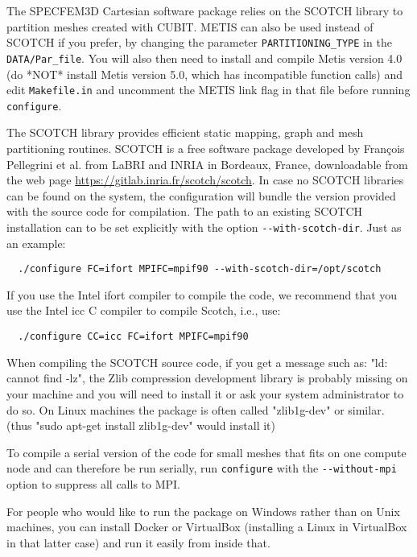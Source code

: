 The SPECFEM3D Cartesian software package relies on the SCOTCH library
to partition meshes created with CUBIT. METIS \citep{KaKu98a,KaKu98c,KaKu98b}
can also be used instead of SCOTCH if you prefer, by changing the parameter
\texttt{PARTITIONING\_TYPE} in the \texttt{DATA/Par\_file}. You will also then need to install
and compile Metis version 4.0 (do {*}NOT{*} install Metis version
5.0, which has incompatible function calls) and edit \texttt{Makefile.in}
and uncomment the METIS link flag in that file before running \texttt{configure}.\newline


The SCOTCH library \citep{PeRo96} provides efficient static mapping,
graph and mesh partitioning routines. SCOTCH is a free software package
developed by Fran\c{c}ois Pellegrini et al. from LaBRI and INRIA in Bordeaux,
France, downloadable from the web page \url{https://gitlab.inria.fr/scotch/scotch}.
In case no SCOTCH libraries can be found on the system, the configuration
will bundle the version provided with the source code for compilation.
The path to an existing SCOTCH installation can to be set explicitly
with the option \texttt{-{}-with-scotch-dir}. Just as an example:
\begin{verbatim}
  ./configure FC=ifort MPIFC=mpif90 --with-scotch-dir=/opt/scotch
\end{verbatim}
\noindent
If you use the Intel ifort compiler to compile the code, we recommend
that you use the Intel icc C compiler to compile Scotch, i.e., use:
\begin{verbatim}
  ./configure CC=icc FC=ifort MPIFC=mpif90
\end{verbatim}

When compiling the SCOTCH source code, if you get a message such as: "ld: cannot find -lz",
the Zlib compression development library is probably missing on your machine and you will need to install it or ask your system administrator to
do so. On Linux machines the package is often called "zlib1g-dev" or similar. (thus "sudo apt-get install zlib1g-dev" would install it)\newline

To compile a serial version of the code for small meshes that fits
on one compute node and can therefore be run serially, run \texttt{configure}
with the \texttt{-{}-without-mpi} option to suppress all calls to
MPI.\newline

For people who would like to run the package on Windows rather than on Unix machines, you can install Docker or VirtualBox (installing a Linux in VirtualBox in that latter case) and run it easily from inside that.\newline


